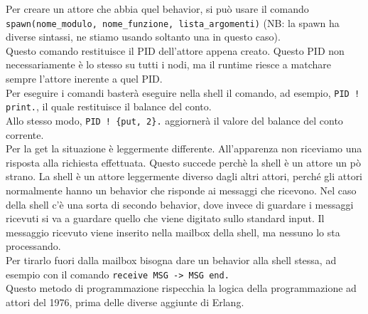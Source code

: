 \documentclass{article}
\begin{document}
Per creare un attore che abbia quel behavior, si può usare il comando \texttt{spawn(nome\_modulo, nome\_funzione, lista\_argomenti)} (NB: la spawn ha diverse sintassi, ne stiamo usando soltanto una in questo caso).\\
Questo comando restituisce il PID dell'attore appena creato. Questo PID non necessariamente è lo stesso su tutti i nodi, ma il runtime riesce a matchare sempre l'attore inerente a quel PID.\vspace{14pt}\\
Per eseguire i comandi basterà eseguire nella shell il comando, ad esempio, \texttt{PID ! print.}, il quale restituisce il balance del conto.\\
Allo stesso modo, \texttt{PID ! \{put, 2\}.} aggiornerà il valore del balance del conto corrente.\vspace{14pt}\\
Per la get la situazione è leggermente differente. All'apparenza non riceviamo una risposta alla richiesta effettuata. Questo succede perchè la shell è un attore un pò strano. La shell è un attore leggermente diverso dagli altri attori, perché gli attori normalmente hanno un behavior che risponde ai messaggi che ricevono. Nel caso della shell c'è una sorta di secondo behavior, dove invece di guardare i messaggi ricevuti si va a guardare quello che viene digitato sullo standard input. Il messaggio ricevuto viene inserito nella mailbox della shell, ma nessuno lo sta processando.\\
Per tirarlo fuori dalla mailbox bisogna dare un behavior alla shell stessa, ad esempio con il comando \texttt{receive MSG -> MSG end.}\vspace{14pt}\\
Questo metodo di programmazione rispecchia la logica della programmazione ad attori del 1976, prima delle diverse aggiunte di Erlang.
\end{document}
